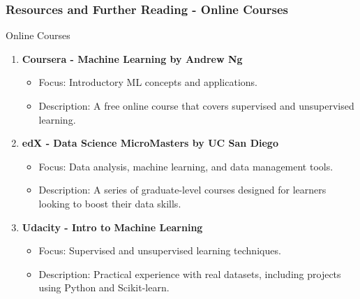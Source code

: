 \documentclass[aspectratio=169]{beamer}
\begin{document}
\begin{frame}[fragile]
    \frametitle{Resources and Further Reading - Online Courses}
    \begin{block}{Online Courses}
        \begin{enumerate}
            \item \textbf{Coursera - Machine Learning by Andrew Ng}
                \begin{itemize}
                    \item Focus: Introductory ML concepts and applications.
                    \item Description: A free online course that covers supervised and unsupervised learning.
                \end{itemize}
            \item \textbf{edX - Data Science MicroMasters by UC San Diego}
                \begin{itemize}
                    \item Focus: Data analysis, machine learning, and data management tools.
                    \item Description: A series of graduate-level courses designed for learners looking to boost their data skills.
                \end{itemize}
            \item \textbf{Udacity - Intro to Machine Learning}
                \begin{itemize}
                    \item Focus: Supervised and unsupervised learning techniques.
                    \item Description: Practical experience with real datasets, including projects using Python and Scikit-learn.
                \end{itemize}
        \end{enumerate}
    \end{block}
\end{frame}
\end{document}
